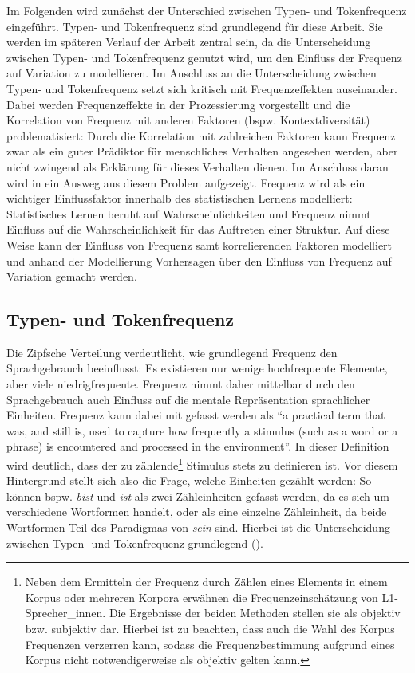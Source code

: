 Im Folgenden wird zunächst der Unterschied zwischen Typen- und Tokenfrequenz eingeführt. Typen- und Tokenfrequenz sind grundlegend für diese Arbeit. Sie werden im späteren Verlauf der Arbeit zentral sein, da die Unterscheidung zwischen Typen- und Tokenfrequenz genutzt wird, um den Einfluss der Frequenz auf Variation zu modellieren. Im Anschluss an die Unterscheidung zwischen Typen- und Tokenfrequenz setzt sich  kritisch mit Frequenzeffekten auseinander. Dabei werden Frequenzeffekte in der Prozessierung vorgestellt und die Korrelation von Frequenz mit anderen Faktoren (bspw. Kontextdiversität) problematisiert: Durch die Korrelation mit zahlreichen Faktoren kann Frequenz zwar als ein guter Prädiktor für menschliches Verhalten angesehen werden, aber nicht zwingend als Erklärung für dieses Verhalten dienen. Im Anschluss daran wird in  ein Ausweg aus diesem Problem aufgezeigt. Frequenz wird als ein wichtiger Einflussfaktor innerhalb des statistischen Lernens modelliert: Statistisches Lernen beruht auf Wahrscheinlichkeiten und Frequenz nimmt Einfluss auf die Wahrscheinlichkeit für das Auftreten einer Struktur. Auf diese Weise kann der Einfluss von Frequenz samt korrelierenden Faktoren modelliert und anhand der Modellierung Vorhersagen über den Einfluss von Frequenz auf Variation gemacht werden.

\subsection{Typen- und Tokenfrequenz}\label{typ} 

Die Zipfsche Verteilung verdeutlicht, wie grundlegend Frequenz den Sprachgebrauch beeinflusst: Es existieren nur wenige hochfrequente Elemente, aber viele niedrigfrequente. Frequenz nimmt daher mittelbar durch den Sprachgebrauch auch Einfluss auf die mentale Repräsentation sprachlicher Einheiten. Frequenz kann dabei mit \textcite[54]{Divjak.2015} gefasst werden als "`a practical term that was, and still is, used to capture how frequently a stimulus (such as a word or a phrase) is encountered and processed in the environment"'. In dieser Definition wird deutlich, dass der zu zählende\footnote{Neben dem Ermitteln der Frequenz durch Zählen eines Elements in einem Korpus oder mehreren Korpora erwähnen \textcite[54]{Divjak.2015} die Frequenzeinschätzung von L1-Sprecher\_innen. Die Ergebnisse der beiden Methoden stellen sie als objektiv bzw. subjektiv dar. Hierbei ist zu beachten, dass auch die Wahl des Korpus Frequenzen verzerren kann, sodass die Frequenzbestimmung aufgrund eines Korpus nicht notwendigerweise als objektiv gelten kann.}  Stimulus stets zu definieren ist. Vor diesem Hintergrund stellt sich also die Frage, welche Einheiten gezählt werden: So können bspw. \textit{bist} und \textit{ist} als zwei Zähleinheiten gefasst werden, da es sich um verschiedene Wortformen handelt, oder als eine einzelne Zähleinheit, da beide Wortformen Teil des Paradigmas von \textit{sein} sind. Hierbei ist die Unterscheidung zwischen Typen- und Tokenfrequenz grundlegend (\cite[378]{Bybee.1997}).

